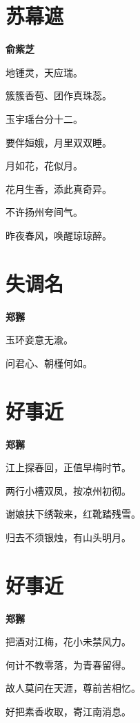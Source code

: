 \documentclass[12pt,a4paper]{ctexbook}
\begin{document}
\section{苏幕遮}
\textbf{俞紫芝}\par\vspace{0.5em}
地锺灵，天应瑞。\par
簇簇香苞、团作真珠蕊。\par
玉宇瑶台分十二。\par
要伴姮娥，月里双双睡。\par
月如花，花似月。\par
花月生香，添此真奇异。\par
不许扬州夸间气。\par
昨夜春风，唤醒琼琼醉。\par

\section{失调名}
\textbf{郑獬}\par\vspace{0.5em}
玉环妾意无渝。\par
问君心、朝槿何如。\par

\section{好事近}
\textbf{郑獬}\par\vspace{0.5em}
江上探春回，正值早梅时节。\par
两行小槽双凤，按凉州初彻。\par
谢娘扶下绣鞍来，红靴踏残雪。\par
归去不须银烛，有山头明月。\par

\section{好事近}
\textbf{郑獬}\par\vspace{0.5em}
把酒对江梅，花小未禁风力。\par
何计不教零落，为青春留得。\par
故人莫问在天涯，尊前苦相忆。\par
好把素香收取，寄江南消息。\par
\end{document}

